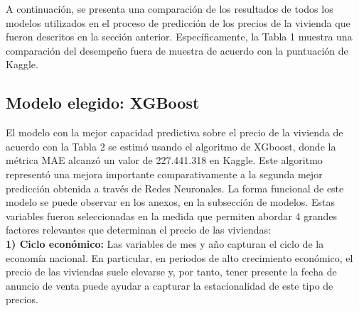 \documentclass[a4paper]{article}
\theoremstyle{remark}
\theoremstyle{definition}
\begin{document}
A continuación, se presenta una comparación de los resultados de todos los modelos utilizados en el proceso de predicción de los precios de la vivienda que fueron descritos en la sección anterior. Específicamente, la Tabla 1 muestra una comparación del desempeño fuera de muestra de acuerdo con la puntuación de Kaggle. 


\begin{table}[h]
\caption{Modelos de Predicción}
\vspace{3mm}
\centering
{}
\label{tab:modelos_prediccion}
\end{table}

\subsection{Modelo elegido: XGBoost}

El modelo con la mejor capacidad predictiva sobre el precio de la vivienda de acuerdo con la Tabla 2 se estimó usando el algoritmo de XGboost, donde la métrica MAE alcanzó un valor de 227.441.318 en Kaggle. Este algoritmo representó una mejora importante comparativamente a la segunda mejor predicción obtenida a través de Redes Neuronales. La forma funcional de este modelo se puede observar en los anexos, en la subsección de modelos. Estas variables fueron seleccionadas en la medida que permiten abordar 4 grandes factores relevantes que determinan el precio de las viviendas: \\

\textbf{1) Ciclo económico:} Las variables de mes y año capturan el ciclo de la economía nacional. En particular, en periodos de alto crecimiento económico, el precio de las viviendas suele elevarse y, por tanto, tener presente la fecha de anuncio de venta puede ayudar a capturar la estacionalidad de este tipo de precios.\\
\end{document}
